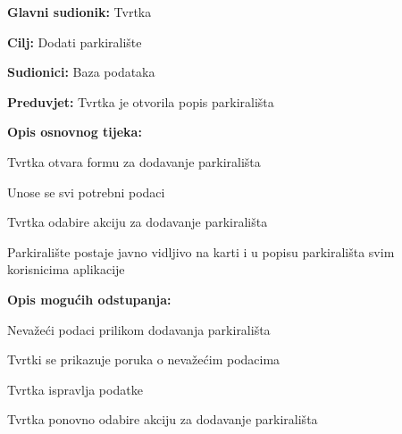 \noindent {}
\begin{packed_item}

	\item \textbf{Glavni sudionik:} Tvrtka
	\item \textbf{Cilj:} Dodati parkiralište
	\item \textbf{Sudionici:} Baza podataka
	\item \textbf{Preduvjet:} Tvrtka je otvorila popis parkirališta
	\item \textbf{Opis osnovnog tijeka:}
	
	\item[] \begin{packed_enum}
		
		\item Tvrtka otvara formu za dodavanje parkirališta
		\item Unose se svi potrebni podaci
		\item Tvrtka odabire akciju za dodavanje parkirališta
		\item Parkiralište postaje javno vidljivo na karti i u popisu parkirališta svim korisnicima aplikacije

	\end{packed_enum}
	
	\item  \textbf{Opis mogućih odstupanja:}
	
	\item[] \begin{packed_item}
		
		\item[2.a] Nevažeći podaci prilikom dodavanja parkirališta
		\item[] \begin{packed_enum}
			
			\item Tvrtki se prikazuje poruka o nevažećim podacima
			\item Tvrtka ispravlja podatke
			\item Tvrtka ponovno odabire akciju za dodavanje parkirališta
			
		\end{packed_enum}
		
	\end{packed_item}
\end{packed_item}

\pagebreak


